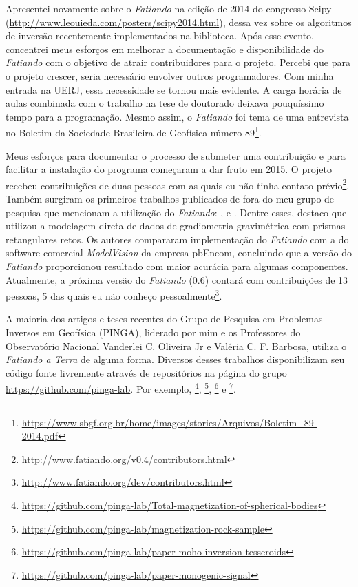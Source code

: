 Apresentei novamente sobre o \textit{Fatiando} na edição de 2014 do congresso
Scipy (\url{http://www.leouieda.com/posters/scipy2014.html}), dessa vez sobre
os algoritmos de inversão recentemente implementados na biblioteca.
Após esse evento, concentrei meus esforços em melhorar a documentação e
disponibilidade do \textit{Fatiando} com o objetivo de atrair
contribuidores para o projeto.
Percebi que para o projeto crescer, seria necessário envolver outros
programadores.
Com minha entrada na UERJ, essa necessidade se tornou mais evidente.
A carga horária de aulas combinada com o trabalho na tese de doutorado deixava
pouquíssimo tempo para a programação.
Mesmo assim, o \textit{Fatiando} foi tema de uma entrevista no Boletim da
Sociedade Brasileira de Geofísica número
89\footnote{\url{https://www.sbgf.org.br/home/images/stories/Arquivos/Boletim_89-2014.pdf}}.

Meus esforços para documentar o processo de submeter uma contribuição e para
facilitar a instalação do programa começaram a dar fruto em 2015.
O projeto recebeu contribuições de duas pessoas com as quais eu não tinha
contato prévio\footnote{\url{http://www.fatiando.org/v0.4/contributors.html}}.
Também surgiram os primeiros trabalhos publicados de fora do meu grupo de
pesquisa que mencionam a utilização do \textit{Fatiando}:
\citet{niccoli2015}, \citet{matthews2016} e \citet{bassett2016}.
Dentre esses, destaco \citet{matthews2016} que utilizou a modelagem direta de
dados de gradiometria gravimétrica com prismas retangulares retos.
Os autores compararam implementação do \textit{Fatiando} com a do software
comercial \textit{ModelVision} da empresa pbEncom, concluindo que a versão do
\textit{Fatiando} proporcionou resultado com maior acurácia para algumas
componentes.
Atualmente, a próxima versão do \textit{Fatiando} (0.6) contará com
contribuições de 13 pessoas, 5 das quais eu não conheço
pessoalmente\footnote{\url{http://www.fatiando.org/dev/contributors.html}}.

A maioria dos artigos e teses recentes do Grupo de Pesquisa em Problemas
Inversos em Geofísica (PINGA), liderado por mim e os Professores do
Observatório Nacional
Vanderlei C. Oliveira Jr e Valéria C. F. Barbosa,
utiliza o \textit{Fatiando a Terra} de alguma forma.
Diversos desses trabalhos disponibilizam seu código fonte livremente através de
repositórios na página do grupo \url{https://github.com/pinga-lab}.
Por exemplo,
\citet{magdir}\footnote{\url{https://github.com/pinga-lab/Total-magnetization-of-spherical-bodies}},
\citet{reis2016}\footnote{\url{https://github.com/pinga-lab/magnetization-rock-sample}},
\citet{moho}\footnote{\url{https://github.com/pinga-lab/paper-moho-inversion-tesseroids}}
e
\citet{monogenic2017}\footnote{\url{https://github.com/pinga-lab/paper-monogenic-signal}}.

